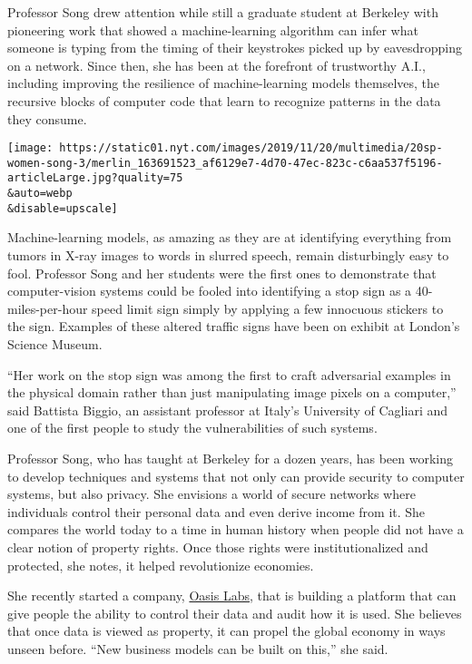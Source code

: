 Professor Song drew attention while still a graduate student at Berkeley
with pioneering work that showed a machine-learning algorithm can infer
what someone is typing from the timing of their keystrokes picked up by
eavesdropping on a network. Since then, she has been at the forefront of
trustworthy A.I., including improving the resilience of machine-learning
models themselves, the recursive blocks of computer code that learn to
recognize patterns in the data they consume.

\texttt{[image: https://static01.nyt.com/images/2019/11/20/multimedia/20sp-women-song-3/merlin\_163691523\_af6129e7-4d70-47ec-823c-c6aa537f5196-articleLarge.jpg?quality=75\\\&auto=webp\\\&disable=upscale]}

Machine-learning models, as amazing as they are at identifying
everything from tumors in X-ray images to words in slurred speech,
remain disturbingly easy to fool. Professor Song and her students were
the first ones to demonstrate that computer-vision systems could be
fooled into identifying a stop sign as a 40-miles-per-hour speed limit
sign simply by applying a few innocuous stickers to the sign. Examples
of these altered traffic signs have been on exhibit at London's Science
Museum.

``Her work on the stop sign was among the first to craft adversarial
examples in the physical domain rather than just manipulating image
pixels on a computer,'' said Battista Biggio, an assistant professor at
Italy's University of Cagliari and one of the first people to study the
vulnerabilities of such systems.

Professor Song, who has taught at Berkeley for a dozen years, has been
working to develop techniques and systems that not only can provide
security to computer systems, but also privacy. She envisions a world of
secure networks where individuals control their personal data and even
derive income from it. She compares the world today to a time in human
history when people did not have a clear notion of property rights. Once
those rights were institutionalized and protected, she notes, it helped
revolutionize economies.

She recently started a company, \href{https://www.oasislabs.com/}{Oasis
Labs}, that is building a platform that can give people the ability to
control their data and audit how it is used. She believes that once data
is viewed as property, it can propel the global economy in ways unseen
before. ``New business models can be built on this,'' she said.

